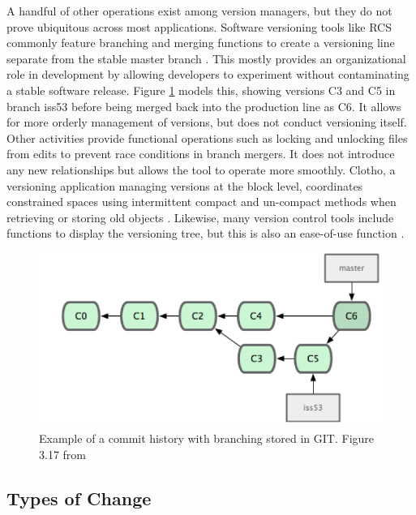 A handful of other operations exist among version managers, but they do not prove ubiquitous across most applications.
Software versioning tools like RCS commonly feature branching and merging functions to create a versioning line separate from the stable master branch \cite{tichy1985rcs}.
This mostly provides an organizational role in development by allowing developers to experiment without contaminating a stable software release.
Figure \ref{GITTree} models this, showing versions C3 and C5 in branch iss53 before being merged back into the production line as C6.
It allows for more orderly management of versions, but does not conduct versioning itself.
Other activities provide functional operations such as locking and unlocking files from edits to prevent race conditions in branch mergers.
It does not introduce any new relationships but allows the tool to operate more smoothly.
Clotho, a versioning application managing versions at the block level, coordinates constrained spaces using intermittent compact and un-compact methods when retrieving or storing old objects \cite{Flouris04clotho:transparent}.
Likewise, many version control tools include functions to display the versioning tree, but this is also an ease-of-use function \cite{Dijkstra1994}.

\begin{figure}
	\centering
	\includegraphics[scale=0.75]{figures/GITCommitTree.png}
	\caption[Example of a commit history with branching stored in GIT.]{Example of a commit history with branching stored in GIT.  Figure 3.17 from \cite{Chacon:2009:PG:1618548}}
	\label{GITTree}
\end{figure}

\subsection{Types of Change}

